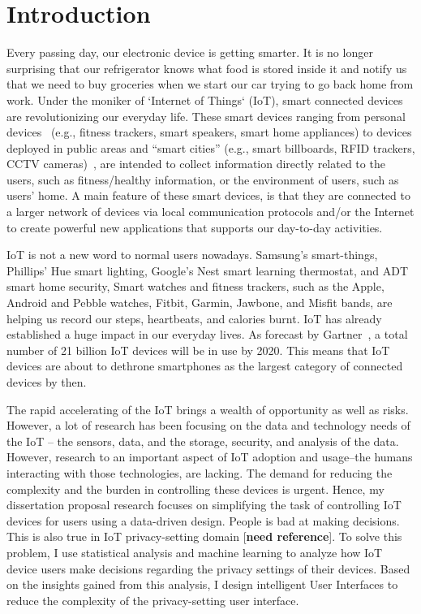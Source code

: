 \chapter{Introduction}

Every passing day, our electronic device is getting smarter. It is no longer surprising that our refrigerator knows what food is stored inside it and notify us that we need to buy groceries when we start our car trying to go back home from work. Under the moniker of `Internet of Things` (IoT), smart connected devices are revolutionizing our everyday life. These smart devices ranging from personal devices~\cite{bahirat_exploring_2018,he_data_nodate} (e.g., fitness trackers, smart speakers, smart home appliances) to devices deployed in public areas and ``smart cities'' (e.g., smart billboards, RFID trackers, CCTV cameras)~\cite{bahirat2018data,lee_privacy_2017,pappachan_towards_2017}, are intended to collect information directly related to the users, such as fitness/healthy information, or the environment of users, such as users' home. A main feature of these smart devices, is that they are connected to a larger network of devices via local communication protocols and/or the Internet to create powerful new applications that supports our day-to-day activities. 

IoT is not a new word to normal users nowadays. Samsung's smart-things, Phillips' Hue smart lighting, Google's Nest smart learning thermostat, and ADT smart home security, Smart watches and fitness trackers, such as the Apple, Android and Pebble watches, Fitbit, Garmin, Jawbone, and Misfit bands, are helping us record our steps, heartbeats, and calories burnt. IoT has already established a huge impact in our everyday lives. As forecast by Gartner~\cite{van_der_meulen_gartner_nodate}, a total number of 21 billion IoT devices will be in use by 2020. This means that IoT devices are about to dethrone smartphones as the largest category of connected devices by then.

The rapid accelerating of the IoT brings a wealth of opportunity as well as risks. However, a lot of research has been focusing on the data and technology needs of the IoT -- the sensors, data, and the storage, security, and analysis of the data. However, research to an important aspect of IoT adoption and usage--the humans interacting with those technologies, are lacking. The demand for reducing the complexity and the burden in controlling these devices is urgent. Hence, my dissertation proposal research focuses on simplifying the task of controlling IoT devices for users using a data-driven design. People is bad at making decisions. This is also true in IoT privacy-setting domain [\textbf{need reference}]. To solve this problem, I use statistical analysis and machine learning to analyze how IoT device users make decisions regarding the privacy settings of their devices. Based on the insights gained from this analysis, I design intelligent User Interfaces to reduce the complexity of the privacy-setting user interface.

